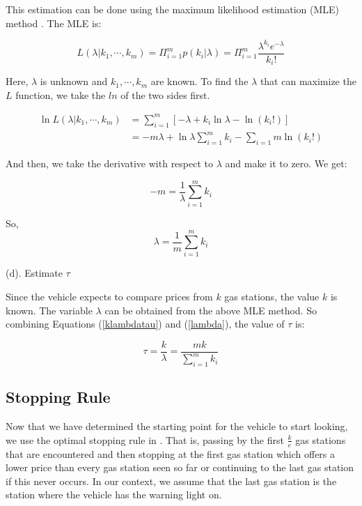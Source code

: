 \documentclass[conference]{IEEEtran}
\theoremstyle{definition}
\begin{document}
This estimation can be done using the  maximum likelihood estimation (MLE) method \cite{MLE}.   The MLE is:

\[ L(\lambda|k_1, \cdots, k_m) = \Pi_{i=1}^{m}p(k_i|\lambda) = \Pi_{i=1}^{m}\frac{{\lambda}^{k_{i}}e^{-\lambda}}{k_{i}!} \]

Here, $\lambda$ is unknown and $k_1, \cdots, k_m$ are known. To find the $\lambda$ that can maximize the $L$ function, we take the $ln$ of the two sides first.

\begin{align*}
\ln L(\lambda|k_1, \cdots, k_m) &= \sum_{i=1}^{m}[-\lambda+k_{i}\ln \lambda - \ln(k_{i}!)] \\
                                &= -m \lambda + \ln \lambda \sum_{i=1}^{m}k_{i}-\sum_{i=1}{m}\ln (k_{i}!)
\end{align*}

And then, we take the derivative with respect to $\lambda$ and make it to zero. We get:

\[-m = \frac{1}{\lambda}\sum_{i=1}^{m}k_{i} \]

So,
\begin{equation} \label{lambda}
\lambda = \frac{1}{m} \sum_{i=1}^{m}k_{i}
\end{equation}

\noindent (d). Estimate   $\tau$

Since the vehicle expects to compare prices from $k$ gas stations, the value $k$ is known. The variable $\lambda$ can be obtained from the above MLE method. So combining Equations (\ref{klambdatau}) and (\ref{lambda}),  the value of $\tau$ is:

\begin{equation} \label{tau}
\tau = \frac{k}{\lambda} = \frac{mk}{\sum_{i=1}^{m}k_{i}}
\end{equation}

\subsection{Stopping Rule}
Now that we have determined the starting point for the vehicle to start looking, we use the optimal stopping rule in \cite{Gilbert1966}. That is, passing by the first $\frac {k}{e}$ gas stations that are encountered and then stopping at the first gas station which offers a lower price than every gas station seen so far or continuing to the last gas station if this never occurs. In our context, we assume that the last gas station is the station where the vehicle has the warning light on.
\end{document}
